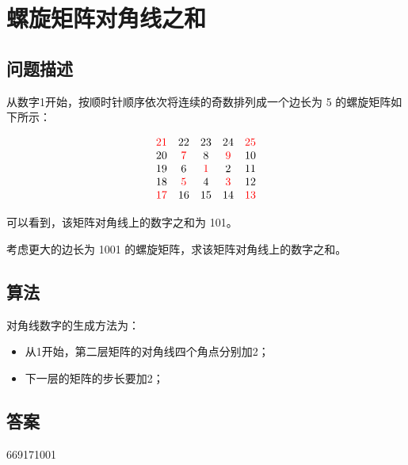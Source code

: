\section{螺旋矩阵对角线之和}\label{sec:problem28}
\subsection{问题描述}
\begin{tcolorbox}

	从数字1开始，按顺时针顺序依次将连续的奇数排列成一个边长为 5 的螺旋矩阵如下所示：

	\[
		\begin{matrix}
			\textcolor{red}{21} & 22      & 23      & 24      & \textcolor{red}{25} \\
			20       & \textcolor{red}{7} & 8       & \textcolor{red}{9} & 10       \\
			19       & 6       & \textcolor{red}{1} & 2       & 11       \\
			18       & \textcolor{red}{5} & 4       & \textcolor{red}{3} & 12       \\
			\textcolor{red}{17} & 16      & 15      & 14      & \textcolor{red}{13}
		\end{matrix}
	\]

	可以看到，该矩阵对角线上的数字之和为 101。

	考虑更大的边长为 1001 的螺旋矩阵，求该矩阵对角线上的数字之和。
\end{tcolorbox}

\subsection{算法}
对角线数字的生成方法为：
\begin{itemize}
	\item 从1开始，第二层矩阵的对角线四个角点分别加2；
	\item 下一层的矩阵的步长要加2；
\end{itemize}

\subsection{答案}
669171001
